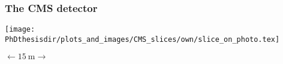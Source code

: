 \begin{frame}\addtocounter{framenumber}{-1}
\frametitle{The CMS detector}
\begin{center}
\vphantom{detects muons going through}

\vfill

\texttt{[image: \\PhDthesisdir/plots\_and\_images/CMS\_slices/own/slice\_on\_photo.tex]}

\vfill

$\longleftarrow \SI{15}{\meter} \longrightarrow$
\end{center}
\end{frame}
